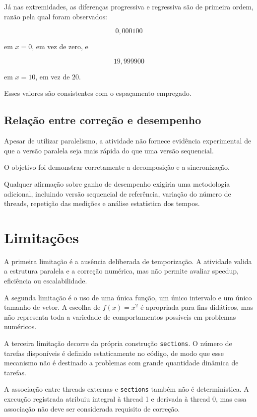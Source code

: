 Já nas extremidades, as diferenças progressiva e regressiva são de primeira
ordem, razão pela qual foram observados:

\[
0{,}000100
\]

em $x=0$, em vez de zero, e

\[
19{,}999900
\]

em $x=10$, em vez de $20$.

Esses valores são consistentes com o espaçamento empregado.


\subsection{Relação entre correção e desempenho}

Apesar de utilizar paralelismo, a atividade não fornece evidência experimental
de que a versão paralela seja mais rápida do que uma versão sequencial.

O objetivo foi demonstrar corretamente a decomposição e a sincronização.

Qualquer afirmação sobre ganho de desempenho exigiria uma metodologia
adicional, incluindo versão sequencial de referência, variação do número de
threads, repetição das medições e análise estatística dos tempos.


\section{Limitações}
\label{sec:atvd08-limitacoes}

A primeira limitação é a ausência deliberada de temporização. A atividade
valida a estrutura paralela e a correção numérica, mas não permite avaliar
speedup, eficiência ou escalabilidade.

A segunda limitação é o uso de uma única função, um único intervalo e um único
tamanho de vetor. A escolha de $f(x)=x^2$ é apropriada para fins didáticos,
mas não representa toda a variedade de comportamentos possíveis em problemas
numéricos.

A terceira limitação decorre da própria construção \texttt{sections}. O
número de tarefas disponíveis é definido estaticamente no código, de modo que
esse mecanismo não é destinado a problemas com grande quantidade dinâmica de
tarefas.

A associação entre threads externas e \texttt{sections} também não é
determinística. A execução registrada atribuiu integral à thread 1 e derivada
à thread 0, mas essa associação não deve ser considerada requisito de
correção.

